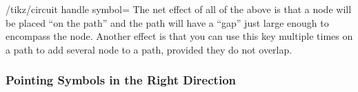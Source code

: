 \begin{key}{/tikz/circuit handle symbol=}
    The net effect of all of the above is that a node will be placed ``on the
    path'' and the path will have a ``gap'' just large enough to encompass the
    node. Another effect is that you can use this key multiple times on a path
    to add several node to a path, provided they do not overlap.
\begin{codeexample}[preamble={\usetikzlibrary{circuits}}]
\end{codeexample}
\begin{codeexample}[preamble={\usetikzlibrary{circuits}}]
\end{codeexample}
\end{key}


\subsubsection{Pointing Symbols in the Right Direction}

